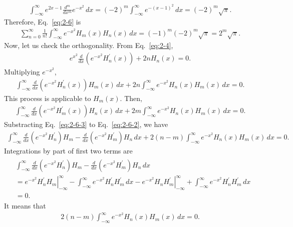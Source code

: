 \documentclass[floatfix,nofootinbib,superscriptaddress,fleqn]{revtex4-2}
\begin{document}
\begin{itemize}
\begin{align}
  \int_{-\infty}^{\infty}e^{2x-1}\frac{d^m}{dx^m}e^{-x^2}\,dx  
  =(-2)^m\int_{-\infty}^{\infty}e^{-(x-1)^2}\,dx=(-2)^m\sqrt{\pi}. 
\end{align}
Therefore, Eq.~\eqref{eq:2-6} is
\begin{align}
  \sum_{n=0}^\infty\frac{1}{n!}\int_{-\infty}^{\infty}e^{-x^2}
  H_m(x)H_n(x)\,dx
  =(-1)^m(-2)^m\sqrt{\pi}=2^m\sqrt{\pi}.
\end{align}
Now, let us check the orthogonality. From Eq.~\eqref{eq:2-4},
\begin{align}\label{eq:2-6-1}
  e^{x^2}\frac{d}{dx}\left(e^{-x^2}H^\prime_n(x)\right)+2nH_n(x)=0.
\end{align}
Multiplying $e^{-x^2}$,
\begin{align}\label{eq:2-6-2}
  \int_{-\infty}^\infty\frac{d}{dx}
  \left(e^{-x^2}H^\prime_n(x)\right)H_m(x)\,dx
  +2n\int_{-\infty}^\infty e^{-x^2}H_n(x)H_m(x)\,dx=0.
\end{align}
This process is applicable to $H_m(x)$. Then,
\begin{align}\label{eq:2-6-3}
  \int_{-\infty}^\infty\frac{d}{dx}
  \left(e^{-x^2}H^\prime_m(x)\right)H_n(x)\,dx
  +2m\int_{-\infty}^\infty e^{-x^2}H_n(x)H_m(x)\,dx=0.
\end{align}
Substracting Eq.~\eqref{eq:2-6-3} to  Eq.~\eqref{eq:2-6-2}, we have
\begin{align}
  \int_{-\infty}^\infty\frac{d}{dx}
  \left(e^{-x^2}H^\prime_n\right)H_m
  -\frac{d}{dx}\left(e^{-x^2}H^\prime_m\right)H_n\,dx
  +2(n-m)\int_{-\infty}^\infty e^{-x^2}H_n(x)H_m(x)\,dx=0.
\end{align}
Integrations by part of first two terms are
\begin{align}
  \begin{split}
    &\int_{-\infty}^\infty\frac{d}{dx}
    \left(e^{-x^2}H^\prime_n\right)H_m
    -\frac{d}{dx}\left(e^{-x^2}H^\prime_m\right)H_n\,dx \\
    &=\left.e^{-x^2}H^\prime_nH_m\right|_{-\infty}^\infty
    -\int_{-\infty}^\infty e^{-x^2}H^\prime_nH^\prime_m\,dx
    -\left.e^{-x^2}H_nH^\prime_m\right|_{-\infty}^\infty
    +\int_{-\infty}^\infty e^{-x^2}H^\prime_nH^\prime_m\,dx \\
    &=0.
  \end{split}
\end{align}
It means that
\begin{align}
  2(n-m)\int_{-\infty}^\infty e^{-x^2}H_n(x)H_m(x)\,dx=0.
\end{align}

\end{itemize}
\end{document}
